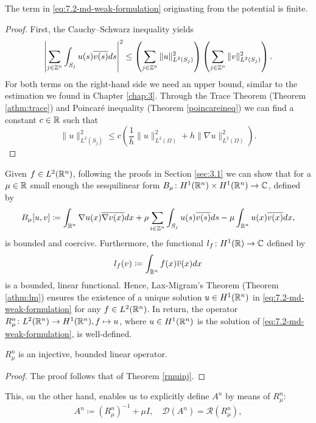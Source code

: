 \begin{remark} 
	The term in \eqref{eq:7.2-md-weak-formulation} originating from the potential is finite.
	
	\begin{proof}
	 First, the Cauchy–Schwarz inequality yields
	\[ \left| \sum_{j \in \mathbb{Z}^{n}} \int_{S_{j}} u(s) \overline{v(s)} ds \right|^{2} \leq \left( \sum_{j \in \mathbb{Z}^{n}} \| u \|_{L^{2}(S_{j})}^{2} \right) \left( \sum_{j \in \mathbb{Z}^{n}} \| v \|_{L^{2}(S_{j})}^{2} \right). \] 
	For both terms on the right-hand side we need an upper bound, similar to the estimation we found in Chapter \ref{chap:3}. Through the Trace Theorem (Theorem \ref{athm:trace}) and Poincaré inequality (Theorem \ref{poincareineq}) we can find a constant $c \in \mathbb{R}$ such that
	\[ \| u \|_{L^{2}(S_{j})}^{2} \leq c \left( \frac{1}{h} \|u\|_{L^{2}(\Omega)}^{2} + h \| \nabla u \|_{L^{2}(\Omega)}^{2} \right). \]	\vspace{-0.5cm}
	\end{proof}
\end{remark}

Given $f \in L^{2}(\mathbb{R}^{n})$, following the proofs in Section \ref{sec:3.1} we can show that for a $\mu \in \mathbb{R}$ small enough the sesquilinear form $B_{\mu} \colon H^{1}(\mathbb{R}^{n}) \times H^{1}(\mathbb{R}^{n}) \rightarrow \mathbb{C}$, defined by
\[ B_{\mu}[u, v] \coloneqq \int_{\mathbb{R}^{n}} \nabla u(x) \overline{\nabla v(x)} dx + \rho \sum_{i \in \mathbb{Z}^{n}} \int_{S_{j}} u(s) \overline{v(s)} ds - \mu \int_{\mathbb{R}^{n}} u(x) \overline{v(x)} dx, \]
 is  bounded and coercive. Furthermore, the functional $l_{f} \colon H^{1}(\mathbb{R}) \rightarrow \mathbb{C}$ defined by
	\[ l_{f}(v) \coloneqq \int_{\mathbb{R}^{n}} f(x) \overline{v}(x) dx \]
is a bounded, linear functional. Hence, Lax-Migram's Theorem (Theorem \ref{athm:lm}) ensures the existence of a unique solution $u \in H^{1}(\mathbb{R}^{n})$ in \eqref{eq:7.2-md-weak-formulation} for any $f \in L^{2}(\mathbb{R}^{n})$. In return, the operator $R_{\mu}^{n} \colon L^{2}(\mathbb{R}^{n}) \rightarrow H^{1}(\mathbb{R}^{n}), f \mapsto u$, where $u \in H^{1}(\mathbb{R}^{n})$ is the solution of \eqref{eq:7.2-md-weak-formulation}, is well-defined. 
~\newpage
\begin{theorem} 
	$R_{\mu}^{n}$ is an injective, bounded linear operator.  
	
	\begin{proof}
		The proof follows that of Theorem \ref{rmuinj}.
	\end{proof}
\end{theorem}

This, on the other hand, enables us to explicitly define $A^{n}$ by means of $R_{\mu}^{n}$:
\[ A^{n} \coloneqq \left(R_{\mu}^{n}\right)^{-1} + \mu I, \quad \mathcal{D}(A^{n}) = \mathcal{R}(R_{\mu}^{n}), \]

